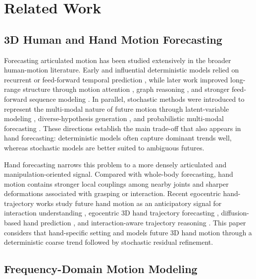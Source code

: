 \section{Related Work}

\subsection{3D Human and Hand Motion Forecasting}

Forecasting articulated motion has been studied extensively in the broader human-motion literature. Early and influential deterministic models relied on recurrent or feed-forward temporal prediction \cite{Martinez2017RNN}, while later work improved long-range structure through motion attention \cite{Mao2020HistoryRepeats}, graph reasoning \cite{Dang2021MSRGCN}, and stronger feed-forward sequence modeling \cite{Guo2023SiMLPe}. In parallel, stochastic methods were introduced to represent the multi-modal nature of future motion through latent-variable modeling \cite{Yuan2020DLow,aliakbarian2020stochastic}, diverse-hypothesis generation \cite{mao2021gsps,Ma2022MultiObjective}, and probabilistic multi-modal forecasting \cite{Salzmann2022Motron}. These directions establish the main trade-off that also appears in hand forecasting: deterministic models often capture dominant trends well, whereas stochastic models are better suited to ambiguous futures.

Hand forecasting narrows this problem to a more densely articulated and manipulation-oriented signal. Compared with whole-body forecasting, hand motion contains stronger local couplings among nearby joints and sharper deformations associated with grasping or interaction. Recent egocentric hand-trajectory works study future hand motion as an anticipatory signal for interaction understanding \cite{Liu2022Hotspots}, egocentric 3D hand trajectory forecasting \cite{Bao2023USST,Hatano2025EgoH4}, diffusion-based hand prediction \cite{Tang2024PromptFDDM}, and interaction-aware trajectory reasoning \cite{Chen2025EgoMAN}. This paper considers that hand-specific setting and models future 3D hand motion through a deterministic coarse trend followed by stochastic residual refinement.

\subsection{Frequency-Domain Motion Modeling}

